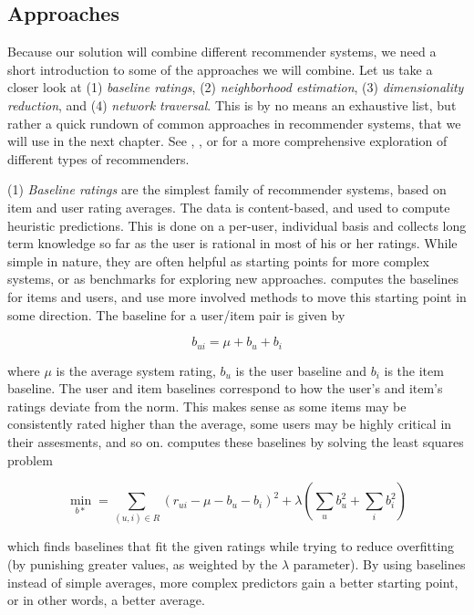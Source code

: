 \subsection{Approaches}

Because our solution will combine different recommender systems, we need a short introduction to some of the approaches we will combine.
Let us take a closer look at (1) \emph{baseline ratings}, (2) \emph{neighborhood estimation}, (3) \emph{dimensionality reduction}, 
and (4) \emph{network traversal}. This is by no means an exhaustive list, but rather
a quick rundown of common approaches in recommender systems, that we will use in the next chapter.
See \cite{Adomavicius2005}, \cite{Pazzani2007}, \cite{Schafer2007} or \cite{Bjorkoy2010d} for a more comprehensive exploration of different types of recommenders.

(1) \emph{Baseline ratings} are the simplest family of recommender systems, based on item and user rating averages.
The data is content-based, and used to compute heuristic predictions. 
This is done on a per-user, individual basis and collects long term knowledge
so far as the user is rational in most of his or her ratings.
While simple in nature, they are often helpful as starting points for more complex systems, or as 
benchmarks for exploring new approaches. \cite[p2]{Koren2008} computes the baselines for items and users, and
use more involved methods to move this starting point in some direction. 
The baseline for a user/item pair is given by

\begin{equation*}
  b_{ui} = \mu + b_u + b_i
\end{equation*}

where $\mu$ is the average system rating, $b_u$ is the user baseline and $b_i$ is the item baseline.
The user and item baselines correspond to how the user's and item's ratings deviate from the norm.
This makes sense as some items may be consistently rated higher than the average, some users may be 
highly critical in their assesments, and so on. \citeauthor{Koren2008} computes these baselines by solving the
least squares problem

\begin{equation*}
  \min_{b*} = \sum_{(u,i) \in R} (r_{ui} - \mu - b_u - b_i)^2 + \lambda ( \sum_{u} b_u^2 + \sum_{i} b_i^2 )
\end{equation*}

which finds baselines that fit the given ratings while trying to reduce overfitting
(by punishing greater values, as weighted by the $\lambda$ parameter). 
By using baselines instead of simple averages, more complex predictors gain a better starting point,
or in other words, a better average.

